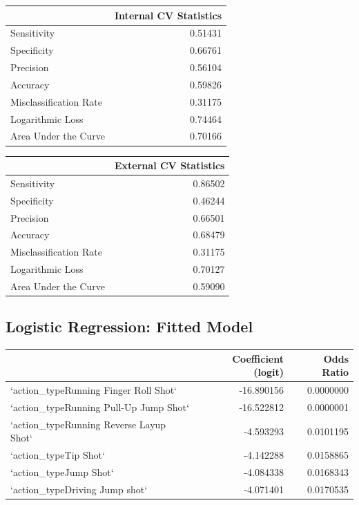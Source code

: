\documentclass[american,]{article}
\begin{document}
\begin{table}

\centering
\begin{tabular}{lr}
\toprule
  & Internal CV Statistics\\
\midrule
Sensitivity & 0.51431\\
Specificity & 0.66761\\
Precision & 0.56104\\
Accuracy & 0.59826\\
Misclassification Rate & 0.31175\\
\addlinespace
Logarithmic Loss & 0.74464\\
Area Under the Curve & 0.70166\\
\bottomrule
\end{tabular}
\centering
\begin{tabular}{lr}
\toprule
  & External CV Statistics\\
\midrule
Sensitivity & 0.86502\\
Specificity & 0.46244\\
Precision & 0.66501\\
Accuracy & 0.68479\\
Misclassification Rate & 0.31175\\
\addlinespace
Logarithmic Loss & 0.70127\\
Area Under the Curve & 0.59090\\
\bottomrule
\end{tabular}
\end{table}

\hypertarget{logistic-regression-fitted-model}{%
\subsection{\texorpdfstring{\textbf{Logistic Regression: Fitted Model}}{Logistic Regression: Fitted Model}}\label{logistic-regression-fitted-model}}

\begin{tabular}{lrr}
\toprule
  & Coefficient (logit) & Odds Ratio\\
\midrule
`action\_typeRunning Finger Roll Shot` & -16.890156 & 0.0000000\\
`action\_typeRunning Pull-Up Jump Shot` & -16.522812 & 0.0000001\\
`action\_typeRunning Reverse Layup Shot` & -4.593293 & 0.0101195\\
`action\_typeTip Shot` & -4.142288 & 0.0158865\\
`action\_typeJump Shot` & -4.084338 & 0.0168343\\
\addlinespace
`action\_typeDriving Jump shot` & -4.071401 & 0.0170535\\
\bottomrule
\end{tabular}
\end{document}
